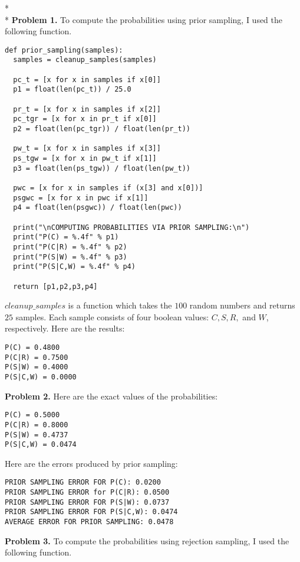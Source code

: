 \documentclass[12pt]{article}
\begin{document}
$\>$\\*\\*
\textbf{Problem 1.} To compute the probabilities using prior sampling, I used the following function.
\begin{verbatim}
def prior_sampling(samples):
  samples = cleanup_samples(samples)

  pc_t = [x for x in samples if x[0]]
  p1 = float(len(pc_t)) / 25.0

  pr_t = [x for x in samples if x[2]]
  pc_tgr = [x for x in pr_t if x[0]]
  p2 = float(len(pc_tgr)) / float(len(pr_t))

  pw_t = [x for x in samples if x[3]]
  ps_tgw = [x for x in pw_t if x[1]]
  p3 = float(len(ps_tgw)) / float(len(pw_t))

  pwc = [x for x in samples if (x[3] and x[0])]
  psgwc = [x for x in pwc if x[1]]
  p4 = float(len(psgwc)) / float(len(pwc))

  print("\nCOMPUTING PROBABILITIES VIA PRIOR SAMPLING:\n")
  print("P(C) = %.4f" % p1)
  print("P(C|R) = %.4f" % p2)
  print("P(S|W) = %.4f" % p3)
  print("P(S|C,W) = %.4f" % p4)

  return [p1,p2,p3,p4]
\end{verbatim}
$cleanup\_samples$ is a function which takes the $100$ random numbers and returns $25$ samples. Each sample consists of four boolean values: $C,S,R,$ and $W$, respectively. Here are the results:
\begin{verbatim}
P(C) = 0.4800
P(C|R) = 0.7500
P(S|W) = 0.4000
P(S|C,W) = 0.0000
\end{verbatim}
\textbf{Problem 2.} Here are the exact values of the probabilities:
\begin{verbatim}
P(C) = 0.5000
P(C|R) = 0.8000
P(S|W) = 0.4737
P(S|C,W) = 0.0474
\end{verbatim}
Here are the errors produced by prior sampling:
\begin{verbatim}
PRIOR SAMPLING ERROR FOR P(C): 0.0200
PRIOR SAMPLING ERROR for P(C|R): 0.0500
PRIOR SAMPLING ERROR FOR P(S|W): 0.0737
PRIOR SAMPLING ERROR FOR P(S|C,W): 0.0474
AVERAGE ERROR FOR PRIOR SAMPLING: 0.0478
\end{verbatim}
\textbf{Problem 3.} To compute the probabilities using rejection sampling, I used the following function.
\end{document}

